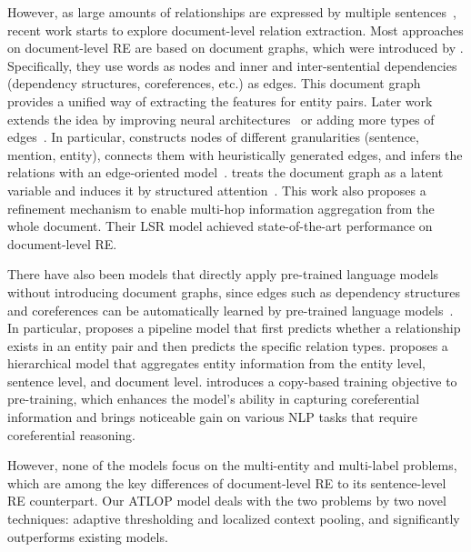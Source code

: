 \documentclass[letterpaper]{article}
\begin{document}
However, as large amounts of relationships are expressed by multiple sentences~\cite{Verga2018SimultaneouslyST,Yao2019DocREDAL}, recent work starts to explore document-level relation extraction.
Most approaches on document-level RE are based on document graphs, which were introduced by \citet{Quirk2017DistantSF}.
Specifically, they use words as nodes and inner and inter-sentential dependencies (dependency structures, coreferences, etc.) as edges.
This document graph provides a unified way of extracting the features for entity pairs.
Later work extends the idea by improving neural architectures~\cite{Peng2017CrossSentenceNR,Verga2018SimultaneouslyST,Song2018NaryRE,Jia2019DocumentLevelNR,Gupta2019NeuralRE} or adding more types of edges~\cite{Christopoulou2019ConnectingTD,Nan2020ReasoningWL}.
In particular, \citet{Christopoulou2019ConnectingTD} constructs nodes of different granularities (sentence, mention, entity), connects them with heuristically generated edges, and infers the relations with an edge-oriented model~\cite{Christopoulou2018AWM}.
\citet{Nan2020ReasoningWL} treats the document graph as a latent variable and induces it by structured attention~\cite{Liu2018LearningST}.
This work also proposes a refinement mechanism to enable multi-hop information aggregation from the whole document.
Their LSR model achieved state-of-the-art performance on document-level RE.

There have also been models that directly apply pre-trained language models without introducing document graphs, since edges such as dependency structures and coreferences can be automatically learned by pre-trained language models~\cite{Clark2019WhatDB,Tenney2019BERTRT,Vig2019AnalyzingTS,Hewitt2019ASP}.
In particular, \citet{Wang2019FinetuneBF} proposes a pipeline model that first predicts whether a relationship exists in an entity pair and then predicts the specific relation types.
\citet{Tang2020HINHI} proposes a hierarchical model that aggregates entity information from the entity level, sentence level, and document level.
\citet{Ye2020CoreferentialRL} introduces a copy-based training objective to pre-training, which enhances the model's ability in capturing coreferential information and brings noticeable gain on various NLP tasks that require coreferential reasoning.

However, none of the models focus on the multi-entity and multi-label problems, which are among the key differences of document-level RE to its sentence-level RE counterpart.
Our ATLOP model deals with the two problems by two novel techniques: adaptive thresholding and localized context pooling, and significantly outperforms existing models.
\end{document}
